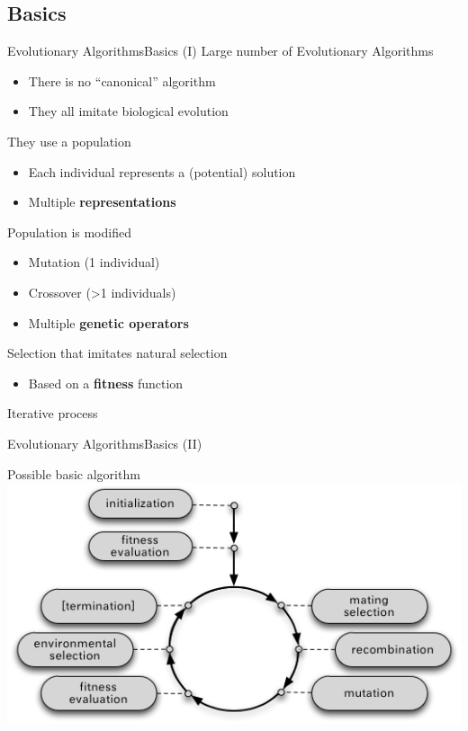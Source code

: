 \documentclass[10pt,compress]{beamer} %
\begin{document}
\subsection{Basics}
\begin{frame}{Evolutionary Algorithms}{Basics (I)} 
	Large number of Evolutionary Algorithms
	\begin{itemize}
		\item There is no ``canonical'' algorithm
		\item They all imitate biological evolution
	\end{itemize}
	They use a population
	\begin{itemize}
		\item Each individual represents a (potential) solution
		\item Multiple \textbf{representations}
	\end{itemize}
	Population is modified
	\begin{itemize}
		\item Mutation (1 individual)
		\item Crossover (>1 individuals)
		\item Multiple \textbf{genetic operators}
	\end{itemize}
	Selection that imitates natural selection
	\begin{itemize}
		\item Based on a \textbf{fitness} function
	\end{itemize}
	Iterative process
\end{frame}

\begin{frame}{Evolutionary Algorithms}{Basics (II)} 
	\begin{center}
		Possible basic algorithm
		\includegraphics[width=0.75\linewidth]{figs/evolution.png}
	\end{center}
\end{frame}
\end{document}
